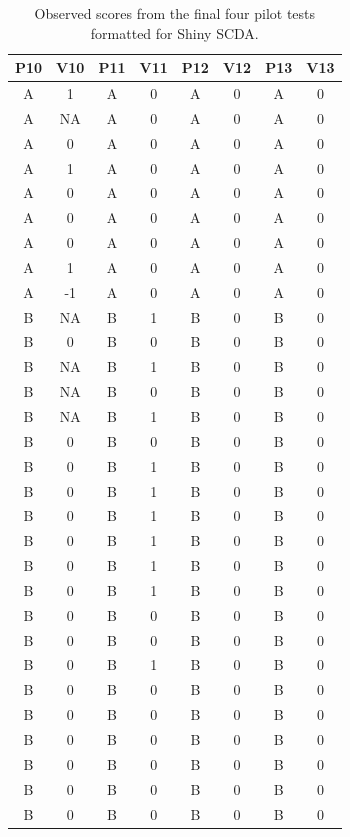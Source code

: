 \documentclass[empirical,issue, twocolumn,authordate]{jote-new-article}
\begin{document}
\begin{table}[t]

  \caption{Observed scores from the final four pilot tests formatted for Shiny SCDA.}
  \label{tab:table3}
\begin{tabular}{c  c  c  c  c  c  c  c}
\toprule
  P10 & V10 & P11 & V11 & P12 & V12 & P13 & V13\\
  \midrule
A & 1 & A & 0 & A & 0 & A & 0\\
A & NA & A & 0 & A & 0 & A & 0\\
A & 0 & A & 0 & A & 0 & A & 0\\
A & 1 & A & 0 & A & 0 & A & 0\\
A & 0 & A & 0 & A & 0 & A & 0\\
A & 0 & A & 0 & A & 0 & A & 0\\
A & 0 & A & 0 & A & 0 & A & 0\\
A & 1 & A & 0 & A & 0 & A & 0\\
A & -1 & A & 0 & A & 0 & A & 0\\
B & NA & B & 1 & B & 0 & B & 0\\
B & 0 & B & 0 & B & 0 & B & 0\\
B & NA & B & 1 & B & 0 & B & 0\\
B & NA & B & 0 & B & 0 & B & 0\\
B & NA & B & 1 & B & 0 & B & 0\\
B & 0 & B & 0 & B & 0 & B & 0\\
B & 0 & B & 1 & B & 0 & B & 0\\
B & 0 & B & 1 & B & 0 & B & 0\\
B & 0 & B & 1 & B & 0 & B & 0\\
B & 0 & B & 1 & B & 0 & B & 0\\
B & 0 & B & 1 & B & 0 & B & 0\\
B & 0 & B & 1 & B & 0 & B & 0\\
B & 0 & B & 0 & B & 0 & B & 0\\
B & 0 & B & 0 & B & 0 & B & 0\\
B & 0 & B & 1 & B & 0 & B & 0\\
B & 0 & B & 0 & B & 0 & B & 0\\
B & 0 & B & 0 & B & 0 & B & 0\\
B & 0 & B & 0 & B & 0 & B & 0\\
B & 0 & B & 0 & B & 0 & B & 0\\
B & 0 & B & 0 & B & 0 & B & 0\\
B & 0 & B & 0 & B & 0 & B & 0\\
\bottomrule


\end{tabular}


\end{table}
\end{document}
